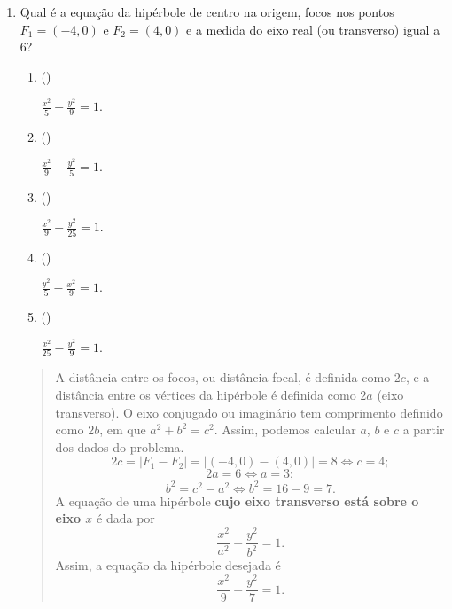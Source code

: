 \documentclass[12pt,a4paper]{article}
\newenvironment{ans}{\color{blue}\begin{quote}}{\end{quote}}
\newif \ifans
\newif \ifvf
\newcommand{\alt}{
	\ifvf
		\ifans
			\item({\sf\color{ForestGreen}V})
		\else 
			\item({\sf\color{Orange}F}) 
		\fi
	\else
		\ifans
			\item({\sf\color{Cyan}X})
		\else 
			\item({\sf\phantom{X}}) 
		\fi	
	\fi	
	\ansfalse
	\vffalse
}
\def\F{\vftrue}
\begin{document}
\begin{enumerate}
\begin{ans}
	\end{ans}
	

\item Qual é a equação da hipérbole de centro na origem, focos nos pontos $F_1=(-4,0)$ e $F_2=(4,0)$ e a medida do eixo real (ou transverso)	igual a $6$? 
	\begin{enumerate}
	\F\alt $\frac{x^2}{5}-\frac{y^2}{9}=1$.
	\F\alt $\frac{x^2}{9}-\frac{y^2}{5}=1$.
	\F\alt $\frac{x^2}{9}-\frac{y^2}{25}=1$.
	\F\alt $\frac{y^2}{5}-\frac{x^2}{9}=1$.
	\F\alt $\frac{x^2}{25}-\frac{y^2}{9}=1$.
	\end{enumerate}
	
	\begin{ans}
	A distância entre os focos, ou distância focal, é definida como $2c$, e a distância entre os vértices da hipérbole é definida como $2a$ (eixo transverso). O eixo conjugado ou imaginário tem comprimento definido como $2b$, em que $a^2+b^2=c^2$. Assim, podemos calcular $a$, $b$ e $c$ a partir dos dados do problema.
	\[
	2c = |F_1-F_2|=|(-4,0)-(4,0)|=8 \iff c=4;
	\]
	\[
	2a = 6 \iff a = 3;
	\]
	\[
	b^2 = c^2-a^2 \iff b^2 = 16-9=7.
	\]
	A equação de uma hipérbole \textbf{cujo eixo transverso está sobre o eixo $x$} é dada por 
	\[
	\frac{x^2}{a^2}-\frac{y^2}{b^2}=1.
	\]
	Assim, a equação da hipérbole desejada é
	\[
	\frac{x^2}{9}-\frac{y^2}{7}=1.
	\]
	\end{ans}
	
	
\end{enumerate}
\end{document}
